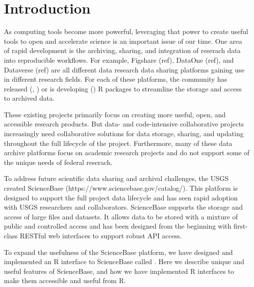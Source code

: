 \section{Introduction}

As computing tools become more powerful, leveraging that power to
create useful tools to open and accelerate science is an important issue
of our time. One area of rapid development is the archiving, sharing,
and integration of reserach data into reproducible workflows. For example,
Figshare (ref), DataOne (ref), and Dataverse (ref) are all different data research data
sharing platforms gaining use in different research fields. For each of these
platforms, the community has released (\cite{rfigshare}, \cite{dvn}) or is
developing (\cite{dataone}) R packages to streamline the storage and access
to archived data.

These existing projects primarily focus on creating more useful, open, and
accessible research products. But data- and code-intensive collaborative projects
increasingly need collaborative solutions for data storage, sharing, and updating
throughout the full lifecycle of the project. Furthermore, many of these data
archive platforms focus on academic research projects and do not support some
of the unique needs of federal reserach.

To address future scientific data sharing and archival challenges, the USGS
created ScienceBase (https://www.sciencebase.gov/catalog/). This platform is designed to support
the full project data lifecycle and has seen rapid adoption with USGS
researchers and collaborators. ScienceBase supports the storage and access
of large files and datasets. It allows data to be stored with a mixture of
public and controlled access and has been designed from the beginning with
first-class RESTful web interfaces to support robust API access.

To expand the usefulness of the ScienceBase platform, we have designed and
implemented an R interface to ScienceBase called \cite{sbtools}. Here we
describe unique and useful features of ScienceBase, and how we have implemented
R interfaces to make them accessible and useful from R.


